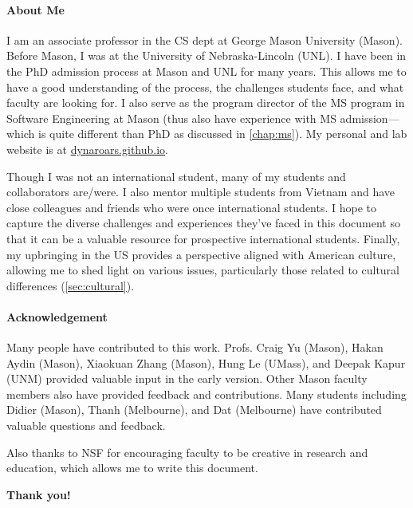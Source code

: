 \documentclass[oneside,11pt,dvipsnames]{book}
\begin{document}
\paragraph{About Me} I am an associate professor in the CS dept at George Mason University (Mason). Before Mason, I was at the University of Nebraska-Lincoln (UNL). I have been in the PhD admission process at Mason and UNL for many years. This allows me to have a good understanding of the process, the challenges students face, and what faculty are looking for. I also serve as the program director of the MS program in Software Engineering at Mason (thus also have experience with MS admission---which is quite different than PhD as discussed in \autoref{chap:ms}). My personal and lab website is at \href{https://dynaroars.github.io}{dynaroars.github.io}.

Though I was not an international student, many of my students and collaborators are/were. I also mentor multiple students from Vietnam and have close colleagues and friends who were once international students. I hope to capture the diverse challenges and experiences they've faced in this document so that it can be a valuable resource for prospective international students.
Finally, my upbringing in the US provides a perspective aligned with American culture, allowing me to shed light on various issues, particularly those related to cultural differences (\autoref{sec:cultural}).




\paragraph{Acknowledgement} Many people have contributed to this work.
Profs. Craig Yu (Mason), Hakan Aydin (Mason), 
Xiaokuan Zhang (Mason), Hung Le (UMass), and Deepak Kapur (UNM) provided valuable input in the early version. Other Mason faculty members also have provided feedback and contributions.  Many students including Didier (Mason), Thanh (Melbourne), and Dat (Melbourne) have contributed valuable questions and feedback. 

Also thanks to NSF for encouraging faculty to be creative in research and education, which allows me to write this document. 

\textbf{Thank you!}

%
%
\end{document}
